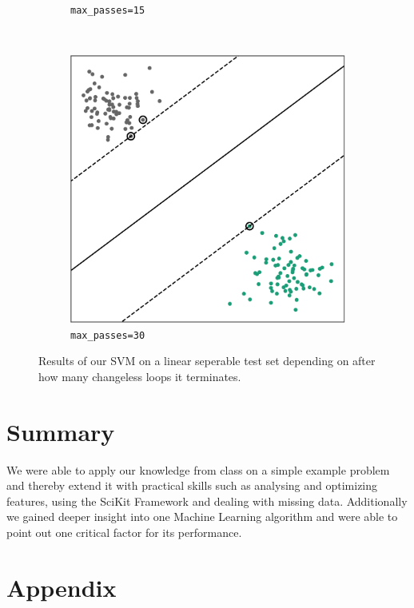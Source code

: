 \begin{figure}
\begin{subfigure}[b]{0.32\textwidth}
        \caption{\texttt{max\_passes=15}}
        \label{fig:max_pass_15}
    \end{subfigure}
    ~ %
    \begin{subfigure}[b]{0.32\textwidth}
        \includegraphics[width=\textwidth]{media_saved/own_test_mpasses_30.pdf}
        \caption{\texttt{max\_passes=30}}
        \label{fig:max_pass_30}
    \end{subfigure}
    \caption{Results of our SVM on a linear seperable test set depending on after how many changeless loops it terminates.}\label{fig:max_passes}
\end{figure}

\section{Summary}
We were able to apply our knowledge from class on a simple example problem and thereby extend it with practical skills such as analysing and optimizing features, using the SciKit Framework and dealing with missing data. Additionally we gained deeper insight into one Machine Learning algorithm and were able to point out one critical factor for its performance.

\pagebreak
\appendix
\section*{Appendix}

